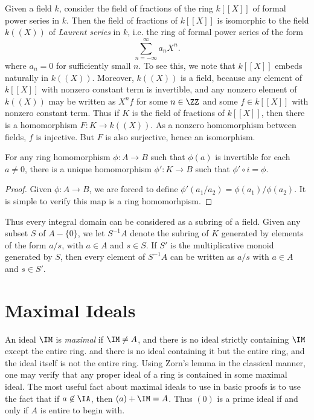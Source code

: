 \begin{example}
    Given a field $k$, consider the field of fractions of the ring $k[[X]]$ of formal power series in $k$. Then the field of fractions of $k[[X]]$ is isomorphic to the field $k((X))$ of \emph{Laurent series} in $k$, i.e. the ring of formal power series of the form
    \[ \sum_{n = -\infty}^\infty a_n X^n. \]
    where $a_n = 0$ for sufficiently small $n$. To see this, we note that $k[[X]]$ embeds naturally in $k((X))$. Moreover, $k((X))$ is a field, because any element of $k[[X]]$ with nonzero constant term is invertible, and any nonzero element of $k((X))$ may be written as $X^n f$ for some $n \in \ZZ$ and some $f \in k[[X]]$ with nonzero constant term. Thus if $K$ is the field of fractions of $k[[X]]$, then there is a homomorphism $F: K \to k((X))$. As a nonzero homomorphism between fields, $f$ is injective. But $F$ is also surjective, hence an isomorphism.
\end{example}

\begin{theorem}
    For any ring homomorphism $\phi: A \to B$ such that $\phi(a)$ is invertible for each $a \neq 0$, there is a unique homomorphism $\phi': K \to B$ such that $\phi' \circ i = \phi$.
\end{theorem}
\begin{proof}
    Given $\phi: A \to B$, we are forced to define $\phi'(a_1/a_2) = \phi(a_1) / \phi(a_2)$. It is simple to verify this map is a ring homomorhpism.
\end{proof}

Thus every integral domain can be considered as a subring of a field. Given any subset $S$ of $A - \{ 0 \}$, we let $S^{-1}A$ denote the subring of $K$ generated by elements of the form $a/s$, with $a \in A$ and $s \in S$. If $S'$ is the multiplicative monoid generated by $S$, then every element of $S^{-1}A$ can be written as $a/s$ with $a \in A$ and $s \in S'$.

\section{Maximal Ideals}

An ideal $\IM$ is \emph{maximal} if $\IM \neq A$, and there is no ideal strictly containing $\IM$ except the entire ring. and there is no ideal containing it but the entire ring, and the ideal itself is not the entire ring. Using Zorn's lemma in the classical manner, one may verify that any proper ideal of a ring is contained in some maximal ideal. The most useful fact about maximal ideals to use in basic proofs is to use the fact that if $a \not \in \IA$, then $(a) + \IM = A$. Thus $(0)$ is a prime ideal if and only if $A$ is entire to begin with.

